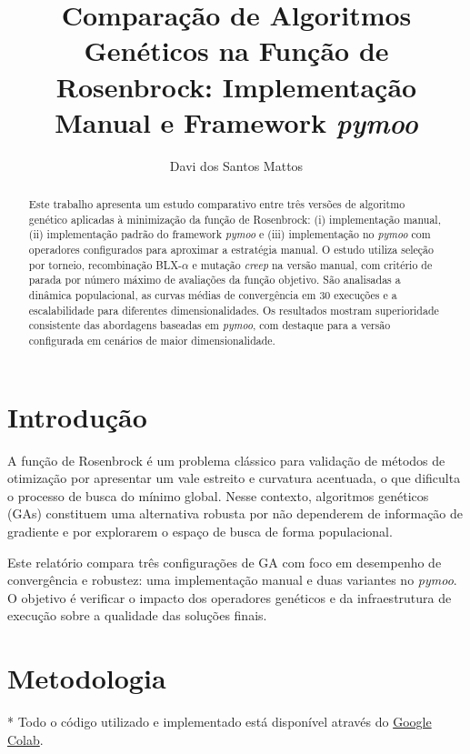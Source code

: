 \documentclass[runningheads]{llncs}
\title{Comparação de Algoritmos Genéticos na Função de Rosenbrock: Implementação Manual e Framework \textit{pymoo}}
\author{Davi dos Santos Mattos\orcidID{119133049}}
\institute{Universidade Federal do Rio de Janeiro, Rio de Janeiro, Brasil\\
\email{secgrad@ic.ufrj.br}}
\begin{document}
\maketitle

\begin{abstract}
Este trabalho apresenta um estudo comparativo entre três versões de algoritmo genético aplicadas à minimização da função de Rosenbrock: (i) implementação manual, (ii) implementação padrão do framework \textit{pymoo} e (iii) implementação no \textit{pymoo} com operadores configurados para aproximar a estratégia manual. O estudo utiliza seleção por torneio, recombinação BLX-$\alpha$ e mutação \textit{creep} na versão manual, com critério de parada por número máximo de avaliações da função objetivo. São analisadas a dinâmica populacional, as curvas médias de convergência em 30 execuções e a escalabilidade para diferentes dimensionalidades. Os resultados mostram superioridade consistente das abordagens baseadas em \textit{pymoo}, com destaque para a versão configurada em cenários de maior dimensionalidade.

\end{abstract}

\section{Introdução}
A função de Rosenbrock é um problema clássico para validação de métodos de otimização por apresentar um vale estreito e curvatura acentuada, o que dificulta o processo de busca do mínimo global. Nesse contexto, algoritmos genéticos (GAs) constituem uma alternativa robusta por não dependerem de informação de gradiente e por explorarem o espaço de busca de forma populacional.

Este relatório compara três configurações de GA com foco em desempenho de convergência e robustez: uma implementação manual e duas variantes no \textit{pymoo}. O objetivo é verificar o impacto dos operadores genéticos e da infraestrutura de execução sobre a qualidade das soluções finais.

\section{Metodologia}
* Todo o código utilizado e implementado está disponível através do \href{https://colab.research.google.com/drive/1EyCrbTjGR4i4W6h1q3MaOLaOT6038weT?usp=sharing}{Google Colab}.
\end{document}
